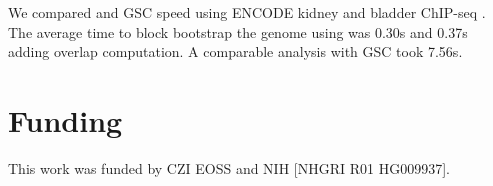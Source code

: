We compared \bootranges and GSC speed using
ENCODE kidney and bladder ChIP-seq . The average time to
block bootstrap the genome using \bootranges was 0.30s and
0.37s adding overlap computation. A comparable
analysis with GSC took 7.56s.

\vspace*{-25pt}

\section*{Funding}
This work was funded by CZI EOSS and NIH [NHGRI R01 HG009937]. 

\vspace*{-25pt}
